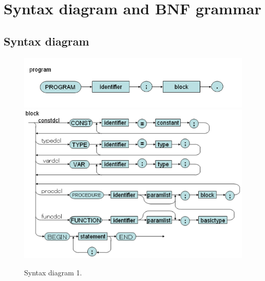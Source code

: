 \documentclass[12pt, a4paper]{report}
\begin{document}
		\section{Syntax diagram and BNF grammar}
			\subsection{Syntax diagram}
				\begin{figure}[h]
					\centering
					\includegraphics[width=\linewidth]{syn1.png}
					\includegraphics[width=\linewidth]{syn2.png}
					
					\caption{Syntax diagram 1.}
					\label{fig:syn1}
				\end{figure}
\end{document}
